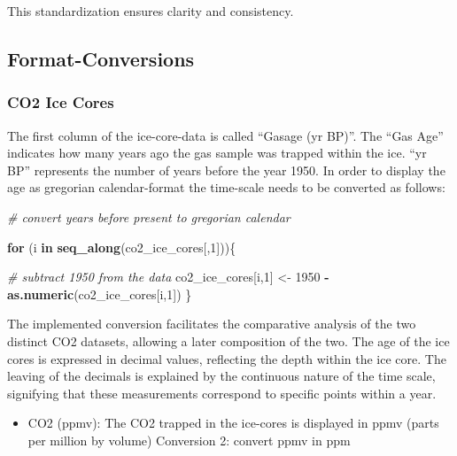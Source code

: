 \documentclass[
]{article}
\newenvironment{Shaded}{\begin{snugshade}}{\end{snugshade}}
\newcommand{\CommentTok}[1]{\textcolor[rgb]{0.56,0.35,0.01}{\textit{#1}}}
\newcommand{\ControlFlowTok}[1]{\textcolor[rgb]{0.13,0.29,0.53}{\textbf{#1}}}
\newcommand{\DecValTok}[1]{\textcolor[rgb]{0.00,0.00,0.81}{#1}}
\newcommand{\FunctionTok}[1]{\textcolor[rgb]{0.13,0.29,0.53}{\textbf{#1}}}
\newcommand{\NormalTok}[1]{#1}
\newcommand{\OtherTok}[1]{\textcolor[rgb]{0.56,0.35,0.01}{#1}}
\newcommand{\SpecialCharTok}[1]{\textcolor[rgb]{0.81,0.36,0.00}{\textbf{#1}}}
\providecommand{\tightlist}{%
  \setlength{\itemsep}{0pt}\setlength{\parskip}{0pt}}
\begin{document}
This standardization ensures clarity and consistency.

\hypertarget{format-conversions}{%
\subsection{Format-Conversions}\label{format-conversions}}

\hypertarget{co2-ice-cores}{%
\subsubsection{CO2 Ice Cores}\label{co2-ice-cores}}

The first column of the ice-core-data is called ``Gasage (yr BP)''. The
``Gas Age'' indicates how many years ago the gas sample was trapped
within the ice. ``yr BP'' represents the number of years before the year
1950. In order to display the age as gregorian calendar-format the
time-scale needs to be converted as follows:

\begin{Shaded}
\begin{Highlighting}[]
\CommentTok{\# convert years before present to gregorian calendar}

  \ControlFlowTok{for}\NormalTok{ (i }\ControlFlowTok{in} \FunctionTok{seq\_along}\NormalTok{(co2\_ice\_cores[,}\DecValTok{1}\NormalTok{]))\{}
    
    \CommentTok{\# subtract 1950 from the data}
\NormalTok{    co2\_ice\_cores[i,}\DecValTok{1}\NormalTok{] }\OtherTok{\textless{}{-}} \DecValTok{1950} \SpecialCharTok{{-}} \FunctionTok{as.numeric}\NormalTok{(co2\_ice\_cores[i,}\DecValTok{1}\NormalTok{])}
\NormalTok{  \}}
\end{Highlighting}
\end{Shaded}

The implemented conversion facilitates the comparative analysis of the
two distinct CO2 datasets, allowing a later composition of the two. The
age of the ice cores is expressed in decimal values, reflecting the
depth within the ice core. The leaving of the decimals is explained by
the continuous nature of the time scale, signifying that these
measurements correspond to specific points within a year.

\begin{itemize}
\tightlist
\item
  CO2 (ppmv): The CO2 trapped in the ice-cores is displayed in ppmv
  (parts per million by volume) Conversion 2: convert ppmv in ppm
\end{itemize}
\end{document}
